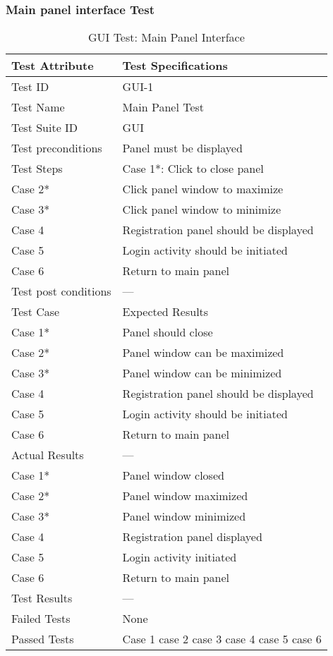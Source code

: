 \documentclass{article}
\begin{document}
\subsubsection{Main panel interface Test}
\begin{table}[htbp]
\begin{center}
\begin{tabular}{|l | l|}
\hline
Test Attribute & Test Specifications \\
\hline
Test ID & GUI-1 \\
\hline

Test Name  & Main Panel Test \\
\hline
Test Suite  ID& GUI \\

\hline
Test preconditions & Panel must be displayed \\
\hline
Test Steps & Case 1*: Click to close panel \\
\hline
Case 2*  &  Click panel window to maximize  \\
\hline
Case 3*  &  Click panel window to minimize  \\
\hline
  Case 4 &  Registration panel should be displayed  \\
\hline
  Case 5 &  Login activity should be initiated \\
\hline
 Case 6 &  Return to main panel  \\
\hline
Test post conditions & --- \\
\hline
Test Case & Expected Results\\
\hline
\hline
Case 1*  &  Panel should close  \\
\hline
Case 2*  &  Panel window can be maximized  \\
\hline
Case 3*  &  Panel window can be minimized  \\
\hline
  Case 4 &  Registration panel should be displayed  \\
\hline
  Case 5 &  Login activity should be initiated \\
\hline
 Case 6 &  Return to main panel  \\
\hline

Actual Results & ---\\
\hline
Case 1*  &  Panel window closed  \\
\hline
Case 2*  &  Panel window maximized  \\
\hline
Case 3*  &  Panel window minimized  \\
\hline
  Case 4 &  Registration panel displayed  \\
\hline
  Case 5 &  Login activity initiated  \\
\hline
 Case 6 &  Return to main panel  \\
\hline

Test Results & ---\\
\hline
Failed Tests & None\\
\hline
Passed Tests & Case 1 case 2 case 3 case 4 case 5 case 6\\
\hline

\end{tabular}
\end{center}
\caption{GUI Test: Main Panel Interface}
\end{table}
\end{document}

